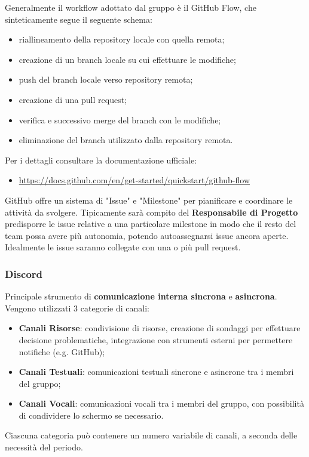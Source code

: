 Generalmente il workflow adottato dal gruppo è il GitHub Flow, che sinteticamente segue il seguente schema:
\begin{itemize}
  \item riallineamento della repository locale con quella remota;
  \item creazione di un branch locale su cui effettuare le modifiche;
  \item push del branch locale verso repository remota;
  \item creazione di una pull request;
  \item verifica e successivo merge del branch con le modifiche;
  \item eliminazione del branch utilizzato dalla repository remota.
\end{itemize}
Per i dettagli consultare la documentazione ufficiale: 
\begin{itemize}
  \item \underline{https://docs.github.com/en/get-started/quickstart/github-flow}
\end{itemize}

GitHub offre un sistema di "Issue" e "Milestone" per pianificare e coordinare le attività da svolgere. Tipicamente sarà compito del \textbf{Responsabile di Progetto} predisporre le issue relative a una particolare milestone in modo che il resto del team possa avere più autonomia, potendo autoassegnarsi issue ancora aperte. Idealmente le issue saranno collegate con una o più pull request.


\subsubsection{Discord}
Principale strumento di \textbf{comunicazione interna sincrona} e \textbf{asincrona}. Vengono utilizzati 3 categorie di canali:
\begin{itemize}
  \item \textbf{Canali Risorse}: condivisione di risorse, creazione di sondaggi per effettuare decisione problematiche, integrazione con strumenti esterni per permettere notifiche (e.g. GitHub);
  \item \textbf{Canali Testuali}: comunicazioni testuali sincrone e asincrone tra i membri del gruppo;
  \item \textbf{Canali Vocali}: comunicazioni vocali tra i membri del gruppo, con possibilità di condividere lo schermo se necessario.
\end{itemize}
Ciascuna categoria può contenere un numero variabile di canali, a seconda delle necessità del periodo.

